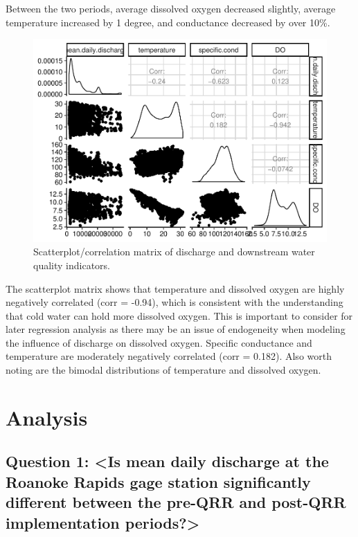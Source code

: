 \documentclass[12pt,]{article}
\begin{document}
Between the two periods, average dissolved oxygen decreased slightly,
average temperature increased by 1 degree, and conductance decreased by
over 10\%.

\begin{figure}
\centering
\includegraphics{Project_Template_files/figure-latex/unnamed-chunk-6-1.pdf}
\caption{Scatterplot/correlation matrix of discharge and downstream
water quality indicators.}
\end{figure}

The scatterplot matrix shows that temperature and dissolved oxygen are
highly negatively correlated (corr = -0.94), which is consistent with
the understanding that cold water can hold more dissolved oxygen. This
is important to consider for later regression analysis as there may be
an issue of endogeneity when modeling the influence of discharge on
dissolved oxygen. Specific conductance and temperature are moderately
negatively correlated (corr = 0.182). Also worth noting are the bimodal
distributions of temperature and dissolved oxygen.

\newpage

\hypertarget{analysis}{%
\section{Analysis}\label{analysis}}

\hypertarget{question-1-is-mean-daily-discharge-at-the-roanoke-rapids-gage-station-significantly-different-between-the-pre-qrr-and-post-qrr-implementation-periods}{%
\subsection{Question 1: \textless{}Is mean daily discharge at the
Roanoke Rapids gage station significantly different between the pre-QRR
and post-QRR implementation
periods?\textgreater{}}\label{question-1-is-mean-daily-discharge-at-the-roanoke-rapids-gage-station-significantly-different-between-the-pre-qrr-and-post-qrr-implementation-periods}}
\end{document}

